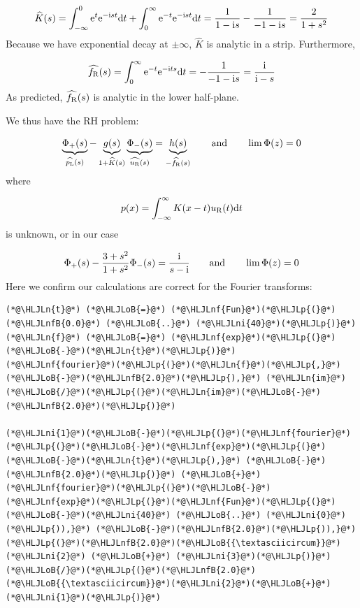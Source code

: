 \documentclass[12pt,a4paper]{article}
\newcommand{\HLJLn}[1]{#1}
\newcommand{\HLJLnf}[1]{\textcolor[RGB]{66,102,213}{#1}}
\newcommand{\HLJLnfB}[1]{\textcolor[RGB]{59,151,46}{#1}}
\newcommand{\HLJLni}[1]{\textcolor[RGB]{59,151,46}{#1}}
\newcommand{\HLJLoB}[1]{\textcolor[RGB]{102,102,102}{\textbf{#1}}}
\newcommand{\HLJLp}[1]{#1}
\def\qqand{\qquad\hbox{and}\qquad}
\def\D{ {\rm d} }
\def\I{ {\rm i} }
\def\E{ {\rm e} }
\def\fR{ f_{\rm R} }
\def\dt{\D t}
\begin{document}
\[
\widehat{K}(s) = \int_{-\infty}^0 \E^{t}\E^{-\I s t} \dt + \int_0^\infty \E^{-t} \E^{-\I s t} \dt =
 {1 \over 1-\I s} - {1 \over -1-\I s} = {2 \over 1+s^2}
\]
Because we have exponential decay at $\pm \infty$, $\widehat{K}$ is analytic in a strip. Furthermore, 

\[
\widehat{f_{\rm R}}(s) = \int_0^\infty \E^{-t} \E^{-\I t s} \dt = -{1 \over -1-\I s} = {\I \over \I-s}
\]
As predicted, $\widehat{\fR}(s)$ is analytic in the lower half-plane.

We thus have the RH problem:

\[
\underbrace{\Phi_+(s)}_{\widehat{p_{\rm L}}(s)} - \underbrace{g(s)}_{1 + \widehat K(s)} 
\underbrace{\Phi_-(s)}_{\widehat{u_{\rm R}}(s)} = \underbrace{h(s)}_{-\widehat{\fR}(s)} \qqand \lim\Phi(z) = 0
\]
where 

\[
p(x) = \int_{-\infty}^\infty K(x-t)u_{\rm R}(t) \dt
\]
is unknown, or in our case

\[
\Phi_+(s) - {3 + s^2 \over 1 + s^2} \Phi_-(s) = {\I \over s - \I} \qqand \lim\Phi(z) = 0
\]
Here we confirm our calculations are correct for the Fourier transforms:


\begin{lstlisting}
(*@\HLJLn{t}@*) (*@\HLJLoB{=}@*) (*@\HLJLnf{Fun}@*)(*@\HLJLp{(}@*)(*@\HLJLnfB{0.0}@*) (*@\HLJLoB{..}@*) (*@\HLJLni{40}@*)(*@\HLJLp{)}@*)
(*@\HLJLn{f}@*) (*@\HLJLoB{=}@*) (*@\HLJLnf{exp}@*)(*@\HLJLp{(}@*)(*@\HLJLoB{-}@*)(*@\HLJLn{t}@*)(*@\HLJLp{)}@*)
(*@\HLJLnf{fourier}@*)(*@\HLJLp{(}@*)(*@\HLJLn{f}@*)(*@\HLJLp{,}@*) (*@\HLJLoB{-}@*)(*@\HLJLnfB{2.0}@*)(*@\HLJLp{),}@*) (*@\HLJLn{im}@*)(*@\HLJLoB{/}@*)(*@\HLJLp{(}@*)(*@\HLJLn{im}@*)(*@\HLJLoB{-}@*)(*@\HLJLnfB{2.0}@*)(*@\HLJLp{)}@*)

(*@\HLJLni{1}@*)(*@\HLJLoB{-}@*)(*@\HLJLp{(}@*)(*@\HLJLnf{fourier}@*)(*@\HLJLp{(}@*)(*@\HLJLoB{-}@*)(*@\HLJLnf{exp}@*)(*@\HLJLp{(}@*)(*@\HLJLoB{-}@*)(*@\HLJLn{t}@*)(*@\HLJLp{),}@*) (*@\HLJLoB{-}@*)(*@\HLJLnfB{2.0}@*)(*@\HLJLp{)}@*) (*@\HLJLoB{+}@*) (*@\HLJLnf{fourier}@*)(*@\HLJLp{(}@*)(*@\HLJLoB{-}@*)(*@\HLJLnf{exp}@*)(*@\HLJLp{(}@*)(*@\HLJLnf{Fun}@*)(*@\HLJLp{(}@*)(*@\HLJLoB{-}@*)(*@\HLJLni{40}@*) (*@\HLJLoB{..}@*) (*@\HLJLni{0}@*)(*@\HLJLp{)),}@*) (*@\HLJLoB{-}@*)(*@\HLJLnfB{2.0}@*)(*@\HLJLp{)),}@*) (*@\HLJLp{(}@*)(*@\HLJLnfB{2.0}@*)(*@\HLJLoB{{\textasciicircum}}@*)(*@\HLJLni{2}@*) (*@\HLJLoB{+}@*) (*@\HLJLni{3}@*)(*@\HLJLp{)}@*)(*@\HLJLoB{/}@*)(*@\HLJLp{(}@*)(*@\HLJLnfB{2.0}@*)(*@\HLJLoB{{\textasciicircum}}@*)(*@\HLJLni{2}@*)(*@\HLJLoB{+}@*)(*@\HLJLni{1}@*)(*@\HLJLp{)}@*)
\end{lstlisting}
\end{document}
